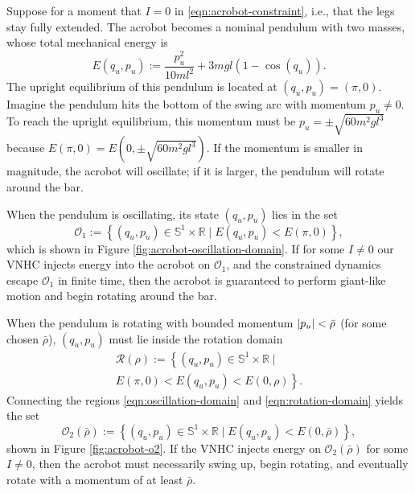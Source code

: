 \documentclass[journal,twoside,onecolumn,draftclsnofoot,web]{ieeecolor}
\DeclarePairedDelimiter{\abs}{\lvert}{\rvert}
\newcommand*{\R}{\mathbb{R}}
\newcommand*{\Sone}{\mathbb{S}^1}
\newcommand*{\SxR}{\Sone \times \R}
\begin{document}
{Suppose for a moment that \(I = 0\) in \eqref{eqn:acrobot-constraint}, i.e.,
that the legs stay fully extended.
The acrobot becomes a nominal pendulum with two masses, whose total mechanical
energy is
\begin{equation}\label{eqn:acrobot-energy}
    E(q_u,p_u) := \frac{p_u^2}{10ml^2} + 3mgl(1 - \cos(q_u))
    .
\end{equation}
The upright equilibrium of this pendulum is located at \((q_u,p_u) = (\pi,0)\).
Imagine the pendulum hits the bottom of the swing arc with momentum 
\(p_u \neq 0\). 
To reach the upright equilibrium, this momentum must be
\(p_u = \pm\sqrt{60m^2gl^3}\) because \(E(\pi,0) = E(0,\pm\sqrt{60m^2gl^3})\).
If the momentum is smaller in magnitude, the acrobot will oscillate; 
if it is larger, the pendulum will rotate around the bar.

When the pendulum is oscillating, its state \((q_u,p_u)\) lies in the set
\begin{equation}\label{eqn:oscillation-domain}
    \mathcal{O}_1 := \left\{(q_u,p_u) \in \SxR 
    \mid E(q_u,p_u) < E(\pi,0) \right\}
    ,
\end{equation}
which is shown in Figure \ref{fig:acrobot-oscillation-domain}.
If for some \(I \neq 0\) our VNHC injects energy into the acrobot on 
\(\mathcal{O}_1\), and the constrained dynamics escape
\(\mathcal{O}_1\) in finite time, then the acrobot is guaranteed to perform
giant-like motion and begin rotating around the bar.

When the pendulum is rotating with bounded momentum
\(\abs{p_u} < \bar{\rho}\) (for some chosen \(\bar{\rho}\)),
\((q_u,p_u)\) must lie inside the rotation domain
\begin{multline}\label{eqn:rotation-domain}
    \mathcal{R}(\rho) := \left\{
        (q_u,p_u) \in \SxR \mid\right.
        \\
        \left.E(\pi,0) < E(q_u,p_u) < E(0,\rho)
    \right\}
    .
\end{multline}
Connecting the regions \eqref{eqn:oscillation-domain} and
\eqref{eqn:rotation-domain} yields the set
\begin{equation}\label{eqn:o-rhobar}
    \mathcal{O}_2(\bar{\rho}) := \left\{(q_u,p_u) \in \SxR
        \mid E(q_u,p_u) < E(0,\bar{\rho}) \right\}
    ,
\end{equation}
shown in Figure \ref{fig:acrobot-o2}.
If the VNHC injects energy on \(\mathcal{O}_2(\bar{\rho})\) for some 
\(I \neq 0\), then the acrobot must necessarily swing up, begin rotating, 
and eventually rotate with a momentum of at least \(\bar{\rho}\).

}
\end{document}
